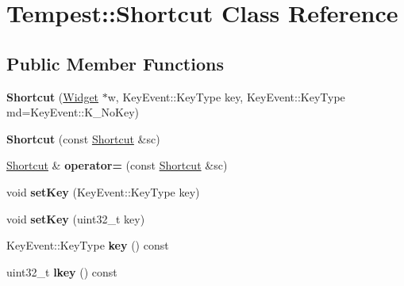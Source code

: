 \hypertarget{class_tempest_1_1_shortcut}{\section{Tempest\+:\+:Shortcut Class Reference}
\label{class_tempest_1_1_shortcut}
}
\subsection*{Public Member Functions}
\begin{DoxyCompactItemize}
\item 
\hypertarget{class_tempest_1_1_shortcut_a07d744cf71f1cee14dffeedb2f1fb2ec}{{\bfseries Shortcut} (\hyperlink{class_tempest_1_1_widget}{Widget} $\ast$w, Key\+Event\+::\+Key\+Type key, Key\+Event\+::\+Key\+Type md=Key\+Event\+::\+K\+\_\+\+No\+Key)}\label{class_tempest_1_1_shortcut_a07d744cf71f1cee14dffeedb2f1fb2ec}

\item 
\hypertarget{class_tempest_1_1_shortcut_a01080ca2f59bfbf39a0e7fe90bf6be71}{{\bfseries Shortcut} (const \hyperlink{class_tempest_1_1_shortcut}{Shortcut} \&sc)}\label{class_tempest_1_1_shortcut_a01080ca2f59bfbf39a0e7fe90bf6be71}

\item 
\hypertarget{class_tempest_1_1_shortcut_afc4f9d9c42bac956d44f820435c4cdf8}{\hyperlink{class_tempest_1_1_shortcut}{Shortcut} \& {\bfseries operator=} (const \hyperlink{class_tempest_1_1_shortcut}{Shortcut} \&sc)}\label{class_tempest_1_1_shortcut_afc4f9d9c42bac956d44f820435c4cdf8}

\item 
\hypertarget{class_tempest_1_1_shortcut_ae0f5ffcf1004e06bae55ad6c89e9bb51}{void {\bfseries set\+Key} (Key\+Event\+::\+Key\+Type key)}\label{class_tempest_1_1_shortcut_ae0f5ffcf1004e06bae55ad6c89e9bb51}

\item 
\hypertarget{class_tempest_1_1_shortcut_a96db7475581938c12dde95dc04bb381f}{void {\bfseries set\+Key} (uint32\+\_\+t key)}\label{class_tempest_1_1_shortcut_a96db7475581938c12dde95dc04bb381f}

\item 
\hypertarget{class_tempest_1_1_shortcut_a5fc59cce2e2dc3fbb0d02e6b3df9283c}{Key\+Event\+::\+Key\+Type {\bfseries key} () const }\label{class_tempest_1_1_shortcut_a5fc59cce2e2dc3fbb0d02e6b3df9283c}

\item 
\hypertarget{class_tempest_1_1_shortcut_a36341a39d4aed727151579c4dc9714be}{uint32\+\_\+t {\bfseries lkey} () const }\label{class_tempest_1_1_shortcut_a36341a39d4aed727151579c4dc9714be}

\end{DoxyCompactItemize}
